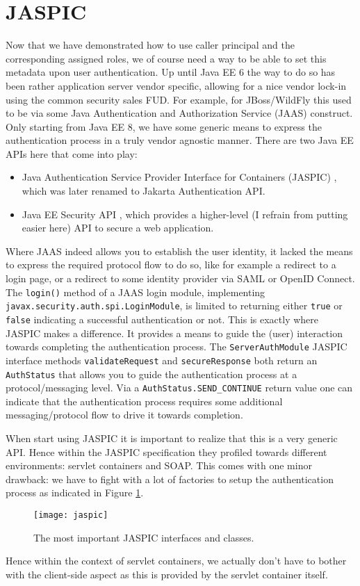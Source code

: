 \section{JASPIC}
Now that we have demonstrated how to use caller principal and the corresponding assigned roles,
we of course need a way to be able to set this metadata upon user authentication.
Up until Java EE 6 the way to do so has been rather application server vendor specific,
allowing for a nice vendor lock-in using the common security sales FUD.
For example, for JBoss/WildFly this used to be via some Java Authentication and Authorization Service (JAAS) \cite{jaas} construct.
Only starting from Java EE 8, we have some generic means to express the authentication process in a truly vendor agnostic manner.
There are two Java EE APIs here that come into play:
\begin{itemize}
	\item Java Authentication Service Provider Interface for Containers (JASPIC) \cite{jaspic}, which was later renamed to Jakarta Authentication API.
	\item Java EE Security API \cite{security-api}, which provides a higher-level (I refrain from putting easier here) API to secure a web application.
\end{itemize}
Where JAAS indeed allows you to establish the user identity,
 it lacked the means to express the required protocol flow to do so, like for example a redirect to a login page,
or a redirect to some identity provider via SAML or OpenID Connect.
The \texttt{login()} method of a JAAS login module, implementing \texttt{javax.security.auth.spi.LoginModule}, is limited to returning either \texttt{true} or \texttt{false} indicating a successful authentication or not.
This is exactly where JASPIC makes a difference.
It provides a means to guide the (user) interaction towards completing the authentication process.
The \texttt{ServerAuthModule} JASPIC interface methods \texttt{validateRequest} and \texttt{secureResponse} both return an \texttt{AuthStatus} that allows you to guide the authentication process at a protocol/messaging level.
Via a \texttt{AuthStatus.SEND\_CONTINUE} return value one can indicate that the authentication process requires some additional messaging/protocol flow to drive it towards completion.

When start using JASPIC it is important to realize that this is a very generic API.
Hence within the JASPIC specification \cite{jaspic} they profiled towards different environments: servlet containers and SOAP.
This comes with one minor drawback: we have to fight with a lot of factories to setup the authentication process as indicated in Figure \ref{fig:jaspic}.
\begin{figure}[htbp]
	\begin{center}
		\texttt{[image: jaspic]}
		\caption{The most important JASPIC interfaces and classes.}
		\label{fig:jaspic}
	\end{center}
\end{figure}
Hence within the context of servlet containers, we actually don't have to bother with the client-side aspect as this is provided by the servlet container itself.

